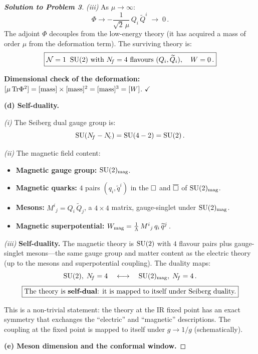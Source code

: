 \documentclass[11pt,a4paper]{article}
\begin{document}
\begin{proof}[\textbf{Solution to Problem 3}]
\textit{(iii)} As $\mu \to \infty$:
\[
  \Phi \to -\frac{1}{\sqrt{2}\,\mu}\, Q_i\,\widetilde{Q}^i
  \;\longrightarrow\; 0\,.
\]
The adjoint $\Phi$ decouples from the low-energy theory (it has
acquired a mass of order $\mu$ from the deformation term).  The
surviving theory is:
\[
  \boxed{\mathcal{N}=1\;\; \mathrm{SU}(2) \text{ with } N_{\!f} = 4 \text{ flavours }
  (Q_i, \widetilde{Q}_i),\quad W = 0\,.}
\]

\textbf{Dimensional check of the deformation:}
$[\mu\,\mathrm{Tr}\Phi^2] = [\mathrm{mass}] \times [\mathrm{mass}]^2
= [\mathrm{mass}]^3 = [W]$.
\quad$\checkmark$

\bigskip

\textbf{(d) Self-duality.}

\textit{(i)} The Seiberg dual gauge group is:
\[
  \mathrm{SU}(N_{\!f} - N_{\!c}) = \mathrm{SU}(4 - 2) = \mathrm{SU}(2)\,.
\]

\textit{(ii)} The magnetic field content:
\begin{itemize}
  \item \textbf{Magnetic gauge group:} $\mathrm{SU}(2)_{\mathrm{mag}}$.
  \item \textbf{Magnetic quarks:} $4$ pairs $(q_i, \widetilde{q}^i)$
    in the $\square$ and $\overline{\square}$ of $\mathrm{SU}(2)_{\mathrm{mag}}$.
  \item \textbf{Mesons:} $M^i{}_j = Q_i\,\widetilde{Q}_j$, a
    $4 \times 4$ matrix, gauge-singlet under $\mathrm{SU}(2)_{\mathrm{mag}}$.
  \item \textbf{Magnetic superpotential:}
    $W_{\mathrm{mag}} = \frac{1}{\Lambda}\, M^i{}_j\, q_i\,
    \widetilde{q}^j$\,.
\end{itemize}

\textit{(iii)} \textbf{Self-duality.}
The magnetic theory is $\mathrm{SU}(2)$ with $4$ flavour pairs plus gauge-singlet
mesons---the same gauge group and matter content as the electric theory
(up to the mesons and superpotential coupling).  The duality maps:
\[
  \mathrm{SU}(2),\;N_{\!f} = 4 \quad\longleftrightarrow\quad
  \mathrm{SU}(2)_{\mathrm{mag}},\;N_{\!f} = 4\,.
\]
\[
  \boxed{\text{The theory is \textbf{self-dual}: it is mapped to itself
  under Seiberg duality.}}
\]

This is a non-trivial statement: the theory at the IR fixed point
has an exact symmetry that exchanges the ``electric'' and ``magnetic''
descriptions.  The coupling at the fixed point is mapped to itself
under $g \to 1/g$ (schematically).

\bigskip

\textbf{(e) Meson dimension and the conformal window.}


\end{proof}
\end{document}

